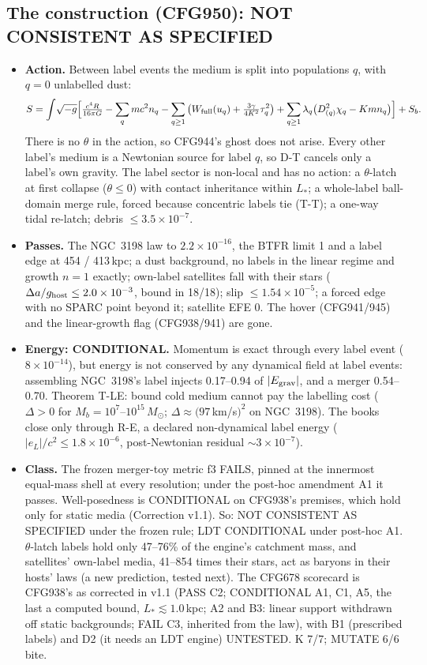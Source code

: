 \documentclass[10pt]{article}
\begin{document}
\subsection{The construction (CFG950): NOT CONSISTENT AS SPECIFIED}
\begin{itemize}
\item \textbf{Action.} Between label events the medium is split into populations $q$, with $q=0$ unlabelled dust:
\[
S=\int\!\sqrt{-g}\Big[\tfrac{c^4R}{16\pi G}-\sum_q mc^2n_q-\sum_{q\ge1}\big(W_{\rm full}(u_q)+\tfrac{3\gamma}{4K^2}\tau_q^2\big)+\sum_{q\ge1}\lambda_q\big(D_{(q)}^2\chi_q-Kmn_q\big)\Big]+S_b .
\]
There is no $\theta$ in the action, so CFG944's ghost does not arise. Every other label's medium is a Newtonian source for label $q$, so D-T cancels only a label's own gravity. The label sector is non-local and has no action: a $\theta$-latch at first collapse ($\theta\le0$) with contact inheritance within $L_*$; a whole-label ball-domain merge rule, forced because concentric labels tie (T-T); a one-way tidal re-latch; debris $\le3.5\times10^{-7}$.
\item \textbf{Passes.} The NGC~3198 law to $2.2\times10^{-16}$, the BTFR limit 1 and a label edge at 454 / 413\,kpc; a dust background, no labels in the linear regime and growth $n=1$ exactly; own-label satellites fall with their stars ($\Delta a/g_{\rm host}\le2.0\times10^{-3}$, bound in 18/18); slip $\le1.54\times10^{-5}$; a forced edge with no SPARC point beyond it; satellite EFE 0. The hover (CFG941/945) and the linear-growth flag (CFG938/941) are gone.
\item \textbf{Energy: CONDITIONAL.} Momentum is exact through every label event ($8\times10^{-14}$), but energy is not conserved by any dynamical field at label events: assembling NGC~3198's label injects 0.17--0.94 of $|E_{\rm grav}|$, and a merger 0.54--0.70. Theorem T-LE: bound cold medium cannot pay the labelling cost ($\Delta>0$ for $M_b=10^7$--$10^{15}\,M_\odot$; $\Delta\approx(97$\,km/s$)^2$ on NGC~3198). The books close only through R-E, a declared non-dynamical label energy ($|e_L|/c^2\le1.8\times10^{-6}$, post-Newtonian residual $\sim3\times10^{-7}$).
\item \textbf{Class.} The frozen merger-toy metric f3 FAILS, pinned at the innermost equal-mass shell at every resolution; under the post-hoc amendment A1 it passes. Well-posedness is CONDITIONAL on CFG938's premises, which hold only for static media (Correction v1.1). So: NOT CONSISTENT AS SPECIFIED under the frozen rule; LDT CONDITIONAL under post-hoc A1. $\theta$-latch labels hold only 47--76\% of the engine's catchment mass, and satellites' own-label media, 41--854 times their stars, act as baryons in their hosts' laws (a new prediction, tested next). The CFG678 scorecard is CFG938's as corrected in v1.1 (PASS C2; CONDITIONAL A1, C1, A5, the last a computed bound, $L_*\lesssim1.0$\,kpc; A2 and B3: linear support withdrawn off static backgrounds; FAIL C3, inherited from the law), with B1 (prescribed labels) and D2 (it needs an LDT engine) UNTESTED. K 7/7; MUTATE 6/6 bite.
\end{itemize}
\end{document}
